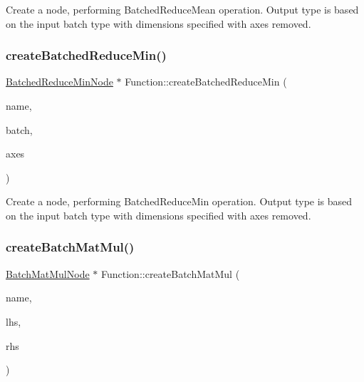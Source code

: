 Create a node, performing Batched\+Reduce\+Mean operation. Output type is based on the input {\ttfamily batch} type with dimensions specified with {\ttfamily axes} removed. \mbox{\label{classglow_1_1_function_a1e0f18260c6c63f0a20760a0a4a7ae2a}} 
\subsubsection{\texorpdfstring{create\+Batched\+Reduce\+Min()}{createBatchedReduceMin()}}
{\footnotesize\ttfamily \hyperlink{classglow_1_1_batched_reduce_min_node}{Batched\+Reduce\+Min\+Node} $\ast$ Function\+::create\+Batched\+Reduce\+Min (\begin{DoxyParamCaption}\item[{llvm\+::\+String\+Ref}]{name,  }\item[{\hyperlink{structglow_1_1_node_value}{Node\+Value}}]{batch,  }\item[{llvm\+::\+Array\+Ref$<$ \hyperlink{namespaceglow_a0ca574644e1e42ef193a9947fb4d8911}{unsigned\+\_\+t} $>$}]{axes }\end{DoxyParamCaption})}

Create a node, performing Batched\+Reduce\+Min operation. Output type is based on the input {\ttfamily batch} type with dimensions specified with {\ttfamily axes} removed. \mbox{\label{classglow_1_1_function_abdb2262cb88e35da526281c917c89774}} 
\subsubsection{\texorpdfstring{create\+Batch\+Mat\+Mul()}{createBatchMatMul()}}
{\footnotesize\ttfamily \hyperlink{classglow_1_1_batch_mat_mul_node}{Batch\+Mat\+Mul\+Node} $\ast$ Function\+::create\+Batch\+Mat\+Mul (\begin{DoxyParamCaption}\item[{llvm\+::\+String\+Ref}]{name,  }\item[{\hyperlink{structglow_1_1_node_value}{Node\+Value}}]{lhs,  }\item[{\hyperlink{structglow_1_1_node_value}{Node\+Value}}]{rhs }\end{DoxyParamCaption})}

